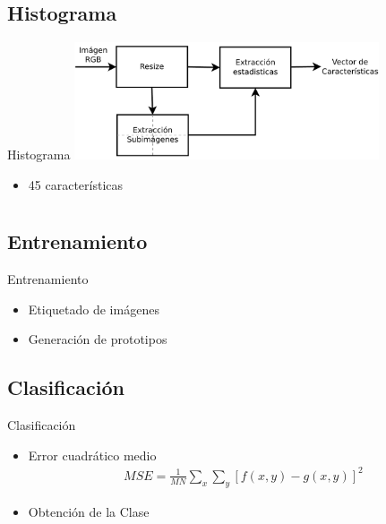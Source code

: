 \documentclass[spanish]{beamer}
\begin{document}
\subsection{Histograma}
\begin{frame}{Histograma}
  \includegraphics[width=9cm]{../diagramas/procesoestadisticas}
  \begin{itemize}
  \item 45 características
  \end{itemize}
\end{frame}

\section[Método]{}
\subsection{Entrenamiento}
\begin{frame}{Entrenamiento}
  \begin{itemize}
  \item Etiquetado de imágenes
  \item Generación de prototipos
  \end{itemize}
\end{frame}
\subsection{Clasificación}
\begin{frame}{Clasificación}
  \begin{itemize}
  \item Error cuadrático medio
    \begin{align*}
      MSE = \frac{1}{MN} \sum_x\sum_y [ f(x,y) - g(x,y) ]^{2}
    \end{align*}
  \item Obtención de la Clase
  \end{itemize}
\end{frame}

\end{document}
